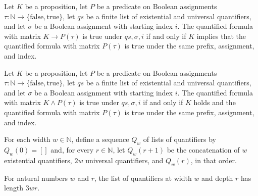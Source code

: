 \begin{theorem}
\label{Complexity.TQBFHard.prefixTruth_imp_const}
\leanok
{}
Let $K$ be a proposition, let $P$ be a predicate on Boolean assignments
$\tau:\mathbb{N}\to\{\mathrm{false},\mathrm{true}\}$, let $qs$ be a finite list of
existential and universal quantifiers, and let $\sigma$ be a Boolean assignment with
starting index $i$. The quantified formula with matrix $K\to P(\tau)$ is true under
$qs,\sigma,i$ if and only if $K$ implies that the quantified formula with matrix
$P(\tau)$ is true under the same prefix, assignment, and index.
\end{theorem}

\begin{theorem}
\label{Complexity.TQBFHard.prefixTruth_and_const}
\leanok
{}
Let $K$ be a proposition, let $P$ be a predicate on Boolean assignments
$\tau:\mathbb{N}\to\{\mathrm{false},\mathrm{true}\}$, let $qs$ be a finite list of
existential and universal quantifiers, and let $\sigma$ be a Boolean assignment with
starting index $i$. The quantified formula with matrix $K\land P(\tau)$ is true under
$qs,\sigma,i$ if and only if $K$ holds and the quantified formula with matrix $P(\tau)$
is true under the same prefix, assignment, and index.
\end{theorem}

\begin{definition}
\label{Complexity.TQBFHard.levelQuants}
\leanok
{}
For each width $w\in\mathbb{N}$, define a sequence $Q_w$ of lists of quantifiers by
$Q_w(0)=[]$ and, for every $r\in\mathbb{N}$, let $Q_w(r+1)$ be the concatenation of $w$
existential quantifiers, $2w$ universal quantifiers, and $Q_w(r)$, in that order.
\end{definition}

\begin{theorem}
\label{Complexity.TQBFHard.length_levelQuants}
\leanok
{}
For natural numbers $w$ and $r$, the list of quantifiers at width $w$ and depth $r$ has
length $3wr$.
\end{theorem}

